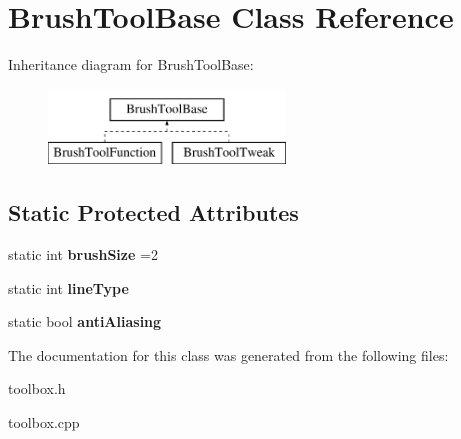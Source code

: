 \hypertarget{class_brush_tool_base}{\section{Brush\-Tool\-Base Class Reference}
\label{class_brush_tool_base}
}
Inheritance diagram for Brush\-Tool\-Base\-:\begin{figure}[H]
\begin{center}
\leavevmode
\includegraphics[height=2.000000cm]{class_brush_tool_base}
\end{center}
\end{figure}
\subsection*{Static Protected Attributes}
\begin{DoxyCompactItemize}
\item 
\hypertarget{class_brush_tool_base_aa6fa9de97a6648fe8780a67ed73389da}{static int {\bfseries brush\-Size} =2}\label{class_brush_tool_base_aa6fa9de97a6648fe8780a67ed73389da}

\item 
\hypertarget{class_brush_tool_base_a945641cf5a7298842c2f43972688ab10}{static int {\bfseries line\-Type}}\label{class_brush_tool_base_a945641cf5a7298842c2f43972688ab10}

\item 
\hypertarget{class_brush_tool_base_aa420951020c02551baf64d01ade5d33c}{static bool {\bfseries anti\-Aliasing}}\label{class_brush_tool_base_aa420951020c02551baf64d01ade5d33c}

\end{DoxyCompactItemize}


The documentation for this class was generated from the following files\-:\begin{DoxyCompactItemize}
\item 
toolbox.\-h\item 
toolbox.\-cpp\end{DoxyCompactItemize}
